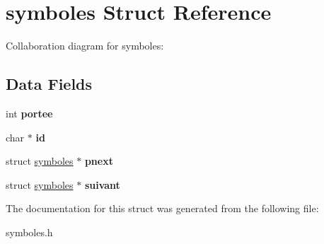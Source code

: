\hypertarget{structsymboles}{}\section{symboles Struct Reference}
\label{structsymboles}


Collaboration diagram for symboles\+:
\subsection*{Data Fields}
\begin{DoxyCompactItemize}
\item 
\mbox{\label{structsymboles_a8acd5efd1a635a1173215f53ae15e7fb}} 
int {\bfseries portee}
\item 
\mbox{\label{structsymboles_aecb3b0d045ada529257a2fbf8f829599}} 
char $\ast$ {\bfseries id}
\item 
\mbox{\label{structsymboles_ae5a917e10d2aea4d16dac81c9556c73c}} 
struct \hyperlink{structsymboles}{symboles} $\ast$ {\bfseries pnext}
\item 
\mbox{\label{structsymboles_a4099297665249f509ea61361ce4a1a73}} 
struct \hyperlink{structsymboles}{symboles} $\ast$ {\bfseries suivant}
\end{DoxyCompactItemize}


The documentation for this struct was generated from the following file\+:\begin{DoxyCompactItemize}
\item 
symboles.\+h\end{DoxyCompactItemize}
